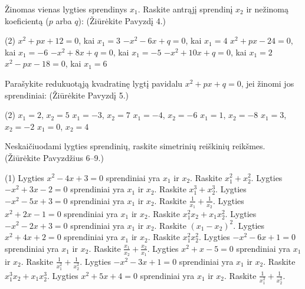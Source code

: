 \documentclass[11pt,a4paper]{scrartcl}
\begin{document}
\begin{problem}
Žinomas vienas lygties sprendinys $x_1$. Raskite antrąjį sprendinį $x_2$ ir nežinomą koeficientą ($p$ arba $q$):
(Žiūrėkite Pavyzdį 4.)
\begin{tasks}[label={(\arabic*)}, label-offset=0.9em](2)
    \task $x^2 + px + 12 = 0$, kai $x_1 = 3$
    \task $-x^2 - 6x + q = 0$, kai $x_1 = 4$
    \task $x^2 + px - 24 = 0$, kai $x_1 = -6$
    \task $-x^2 + 8x + q = 0$, kai $x_1 = -5$
    \task $-x^2 + 10x + q = 0$, kai $x_1 = 2$
    \task $x^2 - px - 18 = 0$, kai $x_1 = 6$
\end{tasks}
\end{problem}

\begin{problem}
Parašykite redukuotąją kvadratinę lygtį pavidalu $x^2 + px + q = 0$, jei žinomi jos sprendiniai:
(Žiūrėkite Pavyzdį 5.)
\begin{tasks}[label={(\arabic*)}, label-offset=0.9em](2)
    \task $x_1 = 2$, $x_2 = 5$
    \task $x_1 = -3$, $x_2 = 7$
    \task $x_1 = -4$, $x_2 = -6$
    \task $x_1 = 1$, $x_2 = -8$
    \task $x_1 = 3$, $x_2 = -2$
    \task $x_1 = 0$, $x_2 = 4$
\end{tasks}
\end{problem}

\begin{problem}
Neskaičiuodami lygties sprendinių, raskite simetrinių reiškinių reikšmes.
(Žiūrėkite Pavyzdžius 6–9.)
\begin{tasks}[label={(\arabic*)}, label-offset=0.9em](1)
    \task Lygties $x^2-4x+3=0$ sprendiniai yra $x_1$ ir $x_2$. Raskite $x_1^2+x_2^2$.
    \task Lygties $-x^2+3x-2=0$ sprendiniai yra $x_1$ ir $x_2$. Raskite $x_1^3+x_2^3$.
    \task Lygties $-x^2-5x+3=0$ sprendiniai yra $x_1$ ir $x_2$. Raskite $\frac{1}{x_1}+\frac{1}{x_2}$.
    \task Lygties $x^2+2x-1=0$ sprendiniai yra $x_1$ ir $x_2$. Raskite $x_1^2x_2+x_1x_2^2$.
    \task Lygties $-x^2-2x+3=0$ sprendiniai yra $x_1$ ir $x_2$. Raskite $(x_1-x_2)^2$.
    \task Lygties $x^2+4x+2=0$ sprendiniai yra $x_1$ ir $x_2$. Raskite $x_1^2x_2^2$.
    \task Lygties $-x^2-6x+1=0$ sprendiniai yra $x_1$ ir $x_2$. Raskite $\frac{x_1}{x_2}+\frac{x_2}{x_1}$.
    \task Lygties $x^2+x-5=0$ sprendiniai yra $x_1$ ir $x_2$. Raskite $\frac{1}{x_1^2}+\frac{1}{x_2^2}$.
    \task Lygties $-x^2-3x+1=0$ sprendiniai yra $x_1$ ir $x_2$. Raskite $x_1^3x_2+x_1x_2^3$.
    \task Lygties $x^2+5x+4=0$ sprendiniai yra $x_1$ ir $x_2$. Raskite $\frac{1}{x_1^2}+\frac{1}{x_2^2}$.
\end{tasks}
\end{problem}
\end{document}
